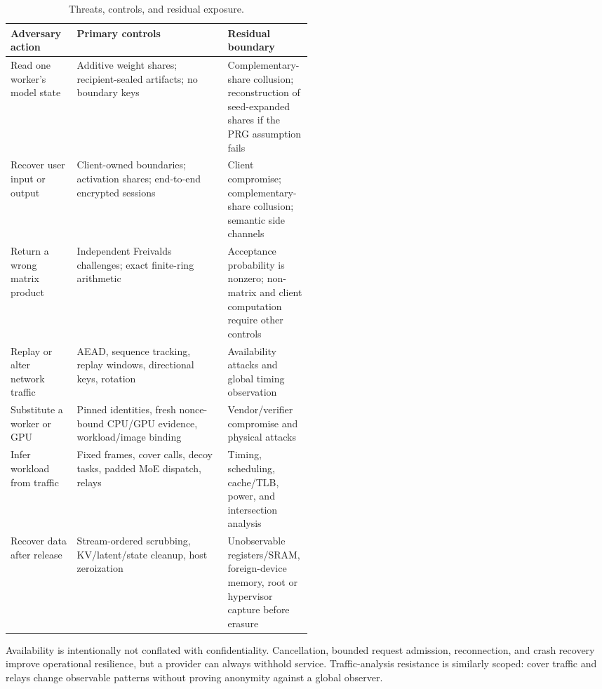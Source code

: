 \begin{table}[htbp]
\centering\small
\caption{Threats, controls, and residual exposure.}
\label{tab:threats}
\begin{tabularx}{\linewidth}{>{\raggedright\arraybackslash}p{0.22\linewidth}>{\raggedright\arraybackslash}X>{\raggedright\arraybackslash}p{0.28\linewidth}}
\toprule
\textbf{Adversary action} & \textbf{Primary controls} & \textbf{Residual boundary} \\
\midrule
Read one worker's model state & Additive weight shares; recipient-sealed artifacts; no boundary keys & Complementary-share collusion; reconstruction of seed-expanded shares if the PRG assumption fails \\
Recover user input or output & Client-owned boundaries; activation shares; end-to-end encrypted sessions & Client compromise; complementary-share collusion; semantic side channels \\
Return a wrong matrix product & Independent Freivalds challenges; exact finite-ring arithmetic & Acceptance probability is nonzero; non-matrix and client computation require other controls \\
Replay or alter network traffic & AEAD, sequence tracking, replay windows, directional keys, rotation & Availability attacks and global timing observation \\
Substitute a worker or GPU & Pinned identities, fresh nonce-bound CPU/GPU evidence, workload/image binding & Vendor/verifier compromise and physical attacks \\
Infer workload from traffic & Fixed frames, cover calls, decoy tasks, padded MoE dispatch, relays & Timing, scheduling, cache/TLB, power, and intersection analysis \\
Recover data after release & Stream-ordered scrubbing, KV/latent/state cleanup, host zeroization & Unobservable registers/SRAM, foreign-device memory, root or hypervisor capture before erasure \\
\bottomrule
\end{tabularx}
\end{table}

Availability is intentionally not conflated with confidentiality. Cancellation, bounded request admission, reconnection, and crash recovery improve operational resilience, but a provider can always withhold service. Traffic-analysis resistance is similarly scoped: cover traffic and relays change observable patterns without proving anonymity against a global observer.
